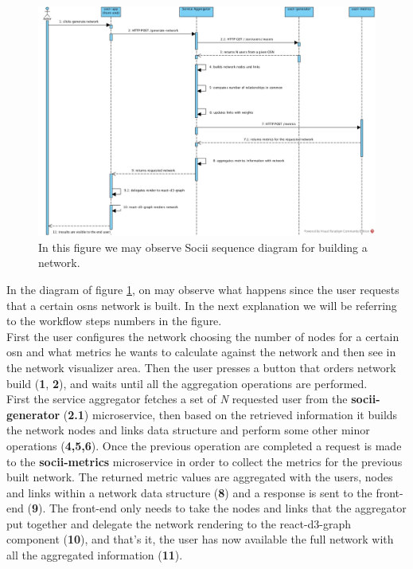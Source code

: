 \begin{figure}[h!]
\begin{center}
  \hspace*{-0.8in}
  \includegraphics[width=1.2\textwidth]{img/socii-sd.jpg}
\end{center}
\caption{\label{img:sociisd} In this figure we may observe Socii sequence diagram for building a network.}
\end{figure}

In the diagram of figure \ref{img:sociisd}, on may observe what happens since the user requests that a certain \glspl{osn} network is built. In the next explanation we will be referring to the workflow steps numbers in the figure.\\
\indent First the user configures the network choosing the number of nodes for a certain \gls{osn} and what metrics he wants to calculate against the network and then see in the network visualizer area. Then the user presses a button that orders network build (\textbf{1}, \textbf{2}), and waits until all the aggregation operations are performed.\\
\indent First the service aggregator fetches a set of \textit{N} requested user from the \textbf{socii-generator} (\textbf{2.1}) microservice, then based on the retrieved information it builds the network nodes and links data structure and perform some other minor operations (\textbf{4,5,6}). Once the previous operation are completed a request is made to the \textbf{socii-metrics} microservice in order to collect the metrics for the previous built network. The returned metric values are aggregated with the users, nodes and links within a network data structure (\textbf{8}) and a response is sent to the front-end (\textbf{9}). The front-end only needs to take the nodes and links that the aggregator put together and delegate the network rendering to the react-d3-graph component (\textbf{10}), and that's it, the user has now available the full network with all the aggregated information (\textbf{11}).


